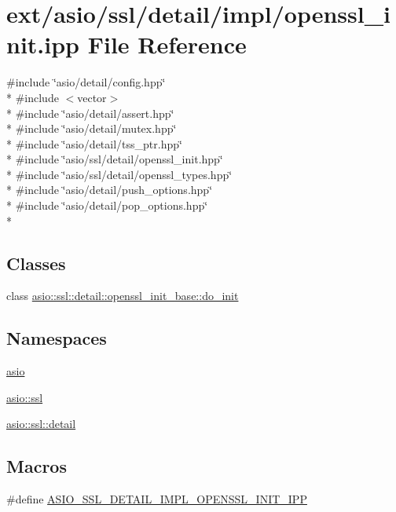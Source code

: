 \hypertarget{openssl__init_8ipp}{}\section{ext/asio/ssl/detail/impl/openssl\+\_\+init.ipp File Reference}
\label{openssl__init_8ipp}
{\ttfamily \#include \char`\"{}asio/detail/config.\+hpp\char`\"{}}\\*
{\ttfamily \#include $<$vector$>$}\\*
{\ttfamily \#include \char`\"{}asio/detail/assert.\+hpp\char`\"{}}\\*
{\ttfamily \#include \char`\"{}asio/detail/mutex.\+hpp\char`\"{}}\\*
{\ttfamily \#include \char`\"{}asio/detail/tss\+\_\+ptr.\+hpp\char`\"{}}\\*
{\ttfamily \#include \char`\"{}asio/ssl/detail/openssl\+\_\+init.\+hpp\char`\"{}}\\*
{\ttfamily \#include \char`\"{}asio/ssl/detail/openssl\+\_\+types.\+hpp\char`\"{}}\\*
{\ttfamily \#include \char`\"{}asio/detail/push\+\_\+options.\+hpp\char`\"{}}\\*
{\ttfamily \#include \char`\"{}asio/detail/pop\+\_\+options.\+hpp\char`\"{}}\\*
\subsection*{Classes}
\begin{DoxyCompactItemize}
\item 
class \hyperlink{classasio_1_1ssl_1_1detail_1_1openssl__init__base_1_1do__init}{asio\+::ssl\+::detail\+::openssl\+\_\+init\+\_\+base\+::do\+\_\+init}
\end{DoxyCompactItemize}
\subsection*{Namespaces}
\begin{DoxyCompactItemize}
\item 
 \hyperlink{namespaceasio}{asio}
\item 
 \hyperlink{namespaceasio_1_1ssl}{asio\+::ssl}
\item 
 \hyperlink{namespaceasio_1_1ssl_1_1detail}{asio\+::ssl\+::detail}
\end{DoxyCompactItemize}
\subsection*{Macros}
\begin{DoxyCompactItemize}
\item 
\#define \hyperlink{openssl__init_8ipp_afaef189faa364752dfe1001bd0e1c40a}{A\+S\+I\+O\+\_\+\+S\+S\+L\+\_\+\+D\+E\+T\+A\+I\+L\+\_\+\+I\+M\+P\+L\+\_\+\+O\+P\+E\+N\+S\+S\+L\+\_\+\+I\+N\+I\+T\+\_\+\+I\+P\+P}
\end{DoxyCompactItemize}


